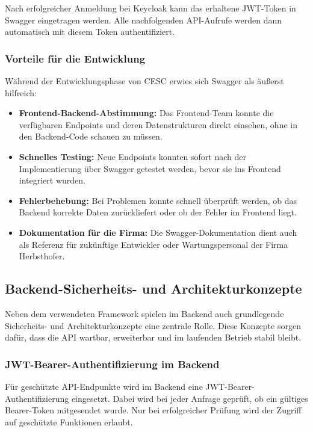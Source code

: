 Nach erfolgreicher Anmeldung bei Keycloak kann das erhaltene JWT-Token in Swagger eingetragen werden. Alle nachfolgenden API-Aufrufe werden dann automatisch mit diesem Token authentifiziert.

\subsubsection{Vorteile für die Entwicklung}

Während der Entwicklungsphase von CESC erwies sich Swagger als äußerst hilfreich:

\begin{itemize}
    \item \textbf{Frontend-Backend-Abstimmung:} Das Frontend-Team konnte die verfügbaren Endpoints und deren Datenstrukturen direkt einsehen, ohne in den Backend-Code schauen zu müssen.
    
    \item \textbf{Schnelles Testing:} Neue Endpoints konnten sofort nach der Implementierung über Swagger getestet werden, bevor sie ins Frontend integriert wurden.
    
    \item \textbf{Fehlerbehebung:} Bei Problemen konnte schnell überprüft werden, ob das Backend korrekte Daten zurückliefert oder ob der Fehler im Frontend liegt.
    
    \item \textbf{Dokumentation für die Firma:} Die Swagger-Dokumentation dient auch als Referenz für zukünftige Entwickler oder Wartungspersonal der Firma Herbsthofer.
\end{itemize}

\subsection{Backend-Sicherheits- und Architekturkonzepte}

Neben dem verwendeten Framework spielen im Backend auch grundlegende Sicherheits- und Architekturkonzepte eine zentrale Rolle. Diese Konzepte sorgen dafür, dass die API wartbar, erweiterbar und im laufenden Betrieb stabil bleibt.

\subsubsection{JWT-Bearer-Authentifizierung im Backend}

Für geschützte API-Endpunkte wird im Backend eine JWT-Bearer-Authentifizierung eingesetzt. Dabei wird bei jeder Anfrage geprüft, ob ein gültiges Bearer-Token mitgesendet wurde. Nur bei erfolgreicher Prüfung wird der Zugriff auf geschützte Funktionen erlaubt.

